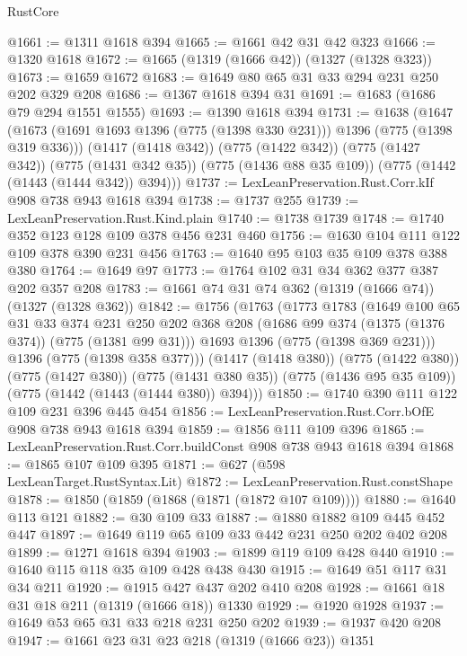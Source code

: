 \begin{lexlean}{RustCore}
\begin{coremodule}
@1661 := @1311 @1618 @394
@1665 := @1661 @42 @31 @42 @323
@1666 := @1320 @1618
@1672 := @1665 (@1319 (@1666 @42)) (@1327 (@1328 @323))
@1673 := @1659 @1672
@1683 := @1649 @80 @65 @31 @33 @294 @231 @250 @202 @329 @208
@1686 := @1367 @1618 @394 @31
@1691 := @1683 (@1686 @79 @294 @1551 @1555)
@1693 := @1390 @1618 @394
@1731 := @1638
    (@1647
      (@1673 (@1691 @1693 @1396 (@775 (@1398 @330 @231))) @1396 (@775 (@1398 @319 @336)))
      (@1417 (@1418 @342))
      (@775 (@1422 @342))
      (@775 (@1427 @342))
      (@775 (@1431 @342 @35))
      (@775 (@1436 @88 @35 @109))
      (@775 (@1442 (@1443 (@1444 @342)) @394)))
@1737 := LexLeanPreservation.Rust.Corr.kIf @908 @738 @943 @1618 @394
@1738 := @1737 @255
@1739 := LexLeanPreservation.Rust.Kind.plain
@1740 := @1738 @1739
@1748 := @1740 @352 @123 @128 @109 @378 @456 @231 @460
@1756 := @1630 @104 @111 @122 @109 @378 @390 @231 @456
@1763 := @1640 @95 @103 @35 @109 @378 @388 @380
@1764 := @1649 @97
@1773 := @1764 @102 @31 @34 @362 @377 @387 @202 @357 @208
@1783 := @1661 @74 @31 @74 @362 (@1319 (@1666 @74)) (@1327 (@1328 @362))
@1842 := @1756
    (@1763
      (@1773
        @1783
        (@1649
          @100
          @65
          @31
          @33
          @374
          @231
          @250
          @202
          @368
          @208
          (@1686 @99 @374 (@1375 (@1376 @374)) (@775 (@1381 @99 @31)))
          @1693
          @1396
          (@775 (@1398 @369 @231)))
        @1396
        (@775 (@1398 @358 @377)))
      (@1417 (@1418 @380))
      (@775 (@1422 @380))
      (@775 (@1427 @380))
      (@775 (@1431 @380 @35))
      (@775 (@1436 @95 @35 @109))
      (@775 (@1442 (@1443 (@1444 @380)) @394)))
@1850 := @1740 @390 @111 @122 @109 @231 @396 @445 @454
@1856 := LexLeanPreservation.Rust.Corr.bOfE @908 @738 @943 @1618 @394
@1859 := @1856 @111 @109 @396
@1865 := LexLeanPreservation.Rust.Corr.buildConst @908 @738 @943 @1618 @394
@1868 := @1865 @107 @109 @395
@1871 := @627 (@598 LexLeanTarget.RustSyntax.Lit)
@1872 := LexLeanPreservation.Rust.constShape
@1878 := @1850 (@1859 (@1868 (@1871 (@1872 @107 @109))))
@1880 := @1640 @113 @121
@1882 := @30 @109 @33
@1887 := @1880 @1882 @109 @445 @452 @447
@1897 := @1649 @119 @65 @109 @33 @442 @231 @250 @202 @402 @208
@1899 := @1271 @1618 @394
@1903 := @1899 @119 @109 @428 @440
@1910 := @1640 @115 @118 @35 @109 @428 @438 @430
@1915 := @1649 @51 @117 @31 @34 @211
@1920 := @1915 @427 @437 @202 @410 @208
@1928 := @1661 @18 @31 @18 @211 (@1319 (@1666 @18)) @1330
@1929 := @1920 @1928
@1937 := @1649 @53 @65 @31 @33 @218 @231 @250 @202
@1939 := @1937 @420 @208
@1947 := @1661 @23 @31 @23 @218 (@1319 (@1666 @23)) @1351

\end{coremodule}
\end{lexlean}
